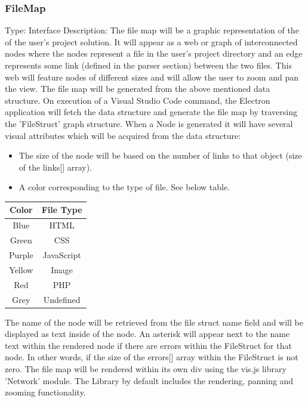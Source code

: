 \documentclass[letterpaper,10pt,titlepage,draftclsnofoot,onecolumn,onesided] {IEEEtran}
\begin{document}
	\subsubsection{FileMap}
	Type: Interface
	Description: 
	The file map will be a graphic representation of the of the user's project solution. 
	It will appear as a web or graph of interconnected nodes where the nodes represent a file in the user's project directory and an edge represents some link (defined in the parser section) between the two files. 
	This web will feature nodes of different sizes and will allow the user to zoom and pan the view.
	The file map will be generated from the above mentioned data structure. 
	On execution of a Visual Studio Code command, the Electron application will fetch the data structure and generate the file map by traversing the 'FileStruct' graph structure.
	When a Node is generated it will have several visual attributes which will be acquired from the data structure:
	\begin{itemize}
	\item The size of the node will be based on the number of links to that object (size of the links[] array). 
	\item A color corresponding to the type of file. See below table.
	\end{itemize}
	\begin{tabular}{| c | c |}
	\hline
	Color & File Type\\
	\hline
	Blue & HTML\\
	Green & CSS\\
	Purple & JavaScript\\
	Yellow & Image\\
	Red & PHP\\
	Grey & Undefined\\
	\hline
	\end{tabular}
	
	The name of the node will be retrieved from the file struct name field and will be displayed as text inside of the node.
	An asterisk will appear next to the name text within the rendered node if there are errors within the FileStruct for that node. In other words, if the size of the errors[] array within the FileStruct is not zero.
	The file map will be rendered within its own div using the vis.js library 'Network' module. 
	The Library by default includes the rendering, panning and zooming functionality. \cite{visjs}
	
\end{document}
